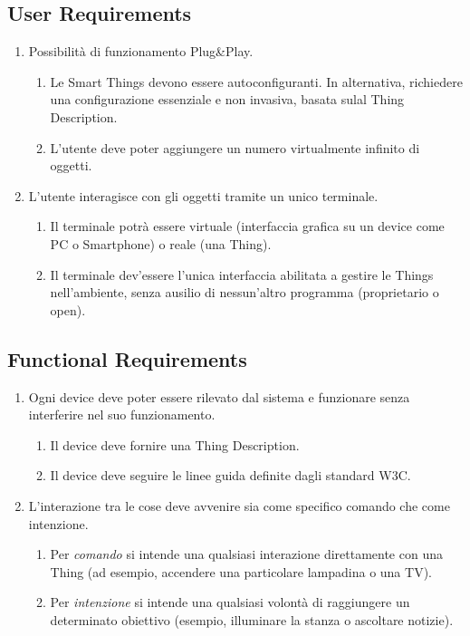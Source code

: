 \documentclass[12pt,a4paper,openright,oneside]{report}
\begin{document}
\subsection{User Requirements}
\begin{enumerate}
	\item Possibilità di funzionamento Plug\&Play.
	\begin{enumerate}[label*=\arabic*.]
		\item Le Smart Things devono essere autoconfiguranti. In alternativa, richiedere una configurazione essenziale e non invasiva, basata sulal Thing Description.
		\item L'utente deve poter aggiungere un numero virtualmente infinito di oggetti.
	\end{enumerate}
	
	\item L'utente interagisce con gli oggetti tramite un unico terminale.
	\begin{enumerate}[label*=\arabic*.]
		\item Il terminale potrà essere virtuale (interfaccia grafica su un device come PC o Smartphone) o reale (una Thing).
		\item Il terminale dev'essere l'unica interfaccia abilitata a gestire le Things nell'ambiente, senza ausilio di nessun'altro programma (proprietario o open).
	\end{enumerate}
\end{enumerate}

\subsection{Functional Requirements}
\begin{enumerate}
	\item Ogni device deve poter essere rilevato dal sistema e funzionare senza interferire nel suo funzionamento.
	\begin{enumerate}[label*=\arabic*.]
		\item Il device deve fornire una Thing Description.
		\item Il device deve seguire le linee guida definite dagli standard W3C.
	\end{enumerate}
	
	
	\item L'interazione tra le cose deve avvenire sia come specifico comando che come intenzione.
	\begin{enumerate}[label*=\arabic*.]
		\item Per \textit{comando} si intende una qualsiasi interazione direttamente con una Thing (ad esempio, accendere una particolare lampadina o una TV).
		\item Per \textit{intenzione} si intende una qualsiasi volontà di raggiungere un determinato obiettivo (esempio, illuminare la stanza o ascoltare notizie).
	\end{enumerate}
\end{enumerate}
\end{document}
